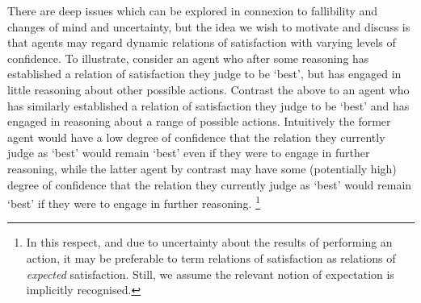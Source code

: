 \documentclass[10pt]{article}
\begin{document}
There are deep issues which can be explored in connexion to fallibility and changes of mind and uncertainty, but the idea we wish to motivate and discuss is that agents may regard dynamic relations of satisfaction with varying levels of confidence.
To illustrate, consider an agent who after some reasoning has established a relation of satisfaction they judge to be `best', but has engaged in little reasoning about other possible actions.
Contrast the above to an agent who has similarly established a relation of satisfaction they judge to be `best' and has engaged in reasoning about a range of possible actions.
Intuitively the former agent would have a low degree of confidence that the relation they currently judge as `best' would remain `best' even if they were to engage in further reasoning, while the latter agent by contrast may have some (potentially high) degree of confidence that the relation they currently judge as `best' would remain `best' if they were to engage in further reasoning.\nolinebreak
\footnote{In this respect, and due to uncertainty about the results of performing an action, it may be preferable to term relations of satisfaction as relations of \emph{expected} satisfaction.
  Still, we assume the relevant notion of expectation is implicitly recognised.}
\end{document}

